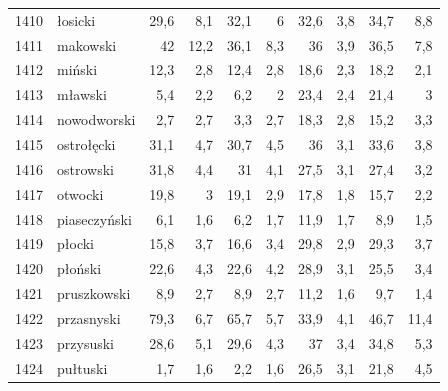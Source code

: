 \begin{center}
\begin{longtable}{lp{3cm}rrrrrrrr}
1410 & łosicki                 & 29,6    & 8,1         & 32,1     & 6            & 32,6     & 3,8          & 34,7     & 8,8          \\
1411 & makowski                & 42      & 12,2        & 36,1     & 8,3          & 36       & 3,9          & 36,5     & 7,8          \\
1412 & miński                  & 12,3    & 2,8         & 12,4     & 2,8          & 18,6     & 2,3          & 18,2     & 2,1          \\
1413 & mławski                 & 5,4     & 2,2         & 6,2      & 2            & 23,4     & 2,4          & 21,4     & 3            \\
1414 & nowodworski             & 2,7     & 2,7         & 3,3      & 2,7          & 18,3     & 2,8          & 15,2     & 3,3          \\
1415 & ostrołęcki              & 31,1    & 4,7         & 30,7     & 4,5          & 36       & 3,1          & 33,6     & 3,8          \\
1416 & ostrowski               & 31,8    & 4,4         & 31       & 4,1          & 27,5     & 3,1          & 27,4     & 3,2          \\
1417 & otwocki                 & 19,8    & 3           & 19,1     & 2,9          & 17,8     & 1,8          & 15,7     & 2,2          \\
1418 & piaseczyński            & 6,1     & 1,6         & 6,2      & 1,7          & 11,9     & 1,7          & 8,9      & 1,5          \\
1419 & płocki                  & 15,8    & 3,7         & 16,6     & 3,4          & 29,8     & 2,9          & 29,3     & 3,7          \\
1420 & płoński                 & 22,6    & 4,3         & 22,6     & 4,2          & 28,9     & 3,1          & 25,5     & 3,4          \\
1421 & pruszkowski             & 8,9     & 2,7         & 8,9      & 2,7          & 11,2     & 1,6          & 9,7      & 1,4          \\
1422 & przasnyski              & 79,3    & 6,7         & 65,7     & 5,7          & 33,9     & 4,1          & 46,7     & 11,4         \\
1423 & przysuski               & 28,6    & 5,1         & 29,6     & 4,3          & 37       & 3,4          & 34,8     & 5,3          \\
1424 & pułtuski                & 1,7     & 1,6         & 2,2      & 1,6          & 26,5     & 3,1          & 21,8     & 4,5          \\

\end{longtable}
\end{center}
